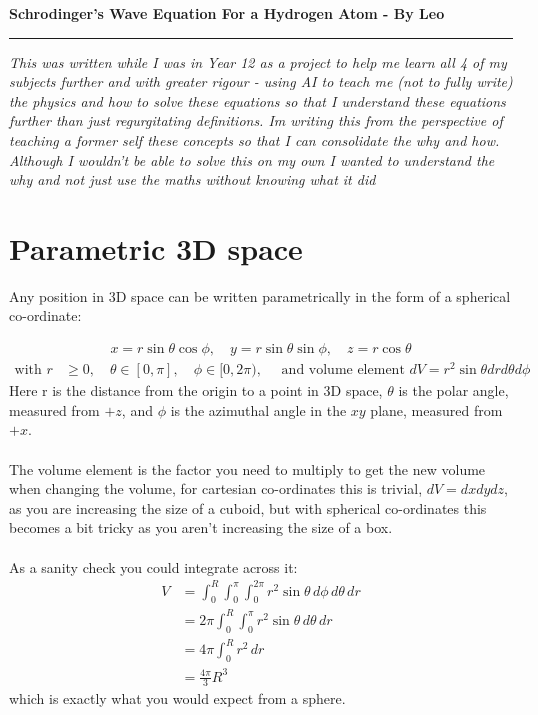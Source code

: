\documentclass{article}
\begin{document}
\noindent\textbf{Schrodinger's Wave Equation For a Hydrogen Atom - By Leo}\\[0.2em]
\noindent\rule{\textwidth}{0.4pt}
\textit{This was written while I was in Year 12 as a project to help me learn all 4 of my subjects further and with greater rigour - using AI to teach me (not to fully write) the physics and how to solve these equations so that I understand these equations further than just regurgitating definitions. Im writing this from the perspective of teaching a former self these concepts so that I can consolidate the why and how. Although I wouldn't be able to solve this on my own I wanted to understand the why and not just use the maths without knowing what it did}
\section{Parametric 3D space}
Any position in 3D space can be written parametrically in the form of a spherical co-ordinate:

\begin{align*}
x = r\sin\theta\cos\phi, \quad
y = r\sin\theta\sin\phi, \quad
z = r\cos\theta 
\end{align*}
\begin{align*}
\text{with }   r& \geq0,\quad \theta \in [0, \pi],\quad \phi \in [0,2\pi),\quad \text{ and volume element } dV = r^2\sin\theta dr d\theta d\phi
\end{align*}
Here r is the distance from the origin to a point in 3D space, $\theta$ is the polar angle, measured from $+z$, and $\phi$ is the azimuthal angle in the $xy$ plane, measured from $+x$.\\\\
The volume element is the factor you need to multiply to get the new volume when changing the volume, for cartesian co-ordinates this is trivial, $dV = dxdydz$, as you are increasing the size of a cuboid, but with spherical co-ordinates this becomes a bit tricky as you aren't increasing the size of a box.\\\\
As a sanity check you could integrate across it:
\begin{align*}
V &= \int_0^R \int_0^\pi \int_0^{2\pi} r^2\sin\theta \,d\phi \,d\theta \,dr\\
&= 2\pi \int_0^R \int_0^\pi r^2\sin\theta \,d\theta \,dr\\
&= 4\pi \int_0^R r^2 \,dr\\
&= \frac{4\pi}{3} R^3
\end{align*}
which is exactly what you would expect from a sphere.\\\\
\end{document}
